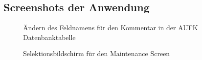 \subsection{Screenshots der Anwendung}
\label{Screenshots}
\begin{figure}[htb]
\centering
{}
\caption{Ändern des Feldnamens für den Kommentar in der AUFK Datenbanktabelle}
\end{figure}
\clearpage
\begin{figure}[htb]
\centering
{}
\caption{Selektionsbildschirm für den Maintenance Screen}
\end{figure}
\clearpage
\begin{figure}[htb]
\centering
{}
\caption{}
\end{figure}
\clearpage
\begin{figure}[htb]
\centering
{}
\caption{}
\end{figure}
\clearpage
\begin{figure}[htb]
\centering
{}
\caption{}
\end{figure}
\clearpage
\begin{figure}[htb]
\centering
{}
\caption{}
\end{figure}
\clearpage
\begin{figure}[htb]
\centering
{}
\caption{}
\end{figure}
\clearpage
\begin{figure}[htb]
\centering
{}
\caption{}
\end{figure}
\clearpage
\begin{figure}[htb]
\centering
{}
\caption{}
\end{figure}
\clearpage
\begin{figure}[htb]
\centering
{}
\caption{}
\end{figure}
\clearpage